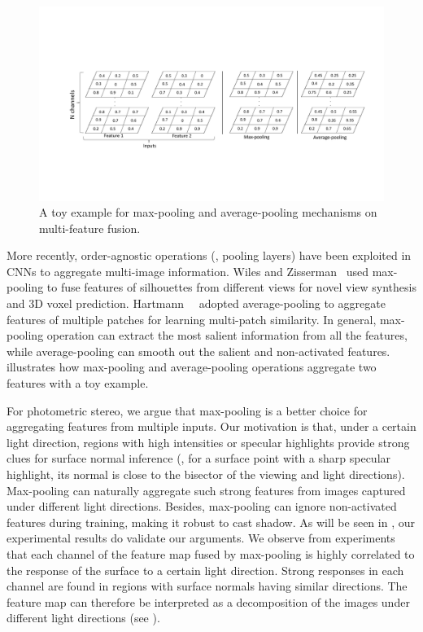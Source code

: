 \begin{figure}[t] \centering
    \includegraphics[width=\textwidth]{ch-psfcn/images/Method/pooling.pdf}
    \caption[Multi-feature fusion with max-pooling and average-pooling]{A toy example for max-pooling and average-pooling mechanisms on multi-feature fusion.} \label{fig:pooling}
\end{figure}

More recently, order-agnostic operations (\eg, pooling layers) have been exploited in CNNs to aggregate multi-image information. Wiles and Zisserman~\cite{wiles2017silnet} used max-pooling to fuse features of silhouettes from different views for novel view synthesis and 3D voxel prediction. Hartmann~\etal~\cite{hartmann2017learned} adopted average-pooling to aggregate features of multiple patches for learning multi-patch similarity. In general, max-pooling operation can extract the most salient information from all the features, while average-pooling can smooth out the salient and non-activated features.  illustrates how max-pooling and average-pooling operations aggregate two features with a toy example.  

For photometric stereo, we argue that max-pooling is a better choice for aggregating features from multiple inputs. 
Our motivation is that, under a certain light direction, regions with high intensities or specular highlights provide strong clues for surface normal inference (\eg, for a surface point with a sharp specular highlight, its normal is close to the bisector of the viewing and light directions). Max-pooling can naturally aggregate such strong features from images captured under different light directions. Besides, max-pooling can ignore non-activated features during training, making it robust to cast shadow. As will be seen in , our experimental results do validate our arguments. We observe from experiments that each channel of the feature map fused by max-pooling is highly correlated to the response of the surface to a certain light direction. Strong responses in each channel are found in regions with surface normals having similar directions. The feature map can therefore be interpreted as a decomposition of the images under different light directions (see ).

